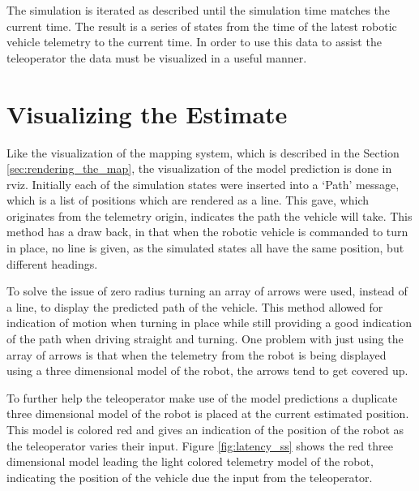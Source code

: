 \documentclass[12pt]{report}
\begin{document}
The simulation is iterated as described until the simulation time matches the current time.  The result is a series of states from the time of the latest robotic vehicle telemetry to the current time.  In order to use this data to assist the teleoperator the data must be visualized in a useful manner.

\section{Visualizing the Estimate}
Like the visualization of the mapping system, which is described in the Section \ref{sec:rendering_the_map}, the visualization of the model prediction is done in rviz.  Initially each of the simulation states were inserted into a `Path' message, which is a list of positions which are rendered as a line.  This gave, which originates from the telemetry origin, indicates the path the vehicle will take.  This method has a draw back, in that when the robotic vehicle is commanded to turn in place, no line is given, as the simulated states all have the same position, but different headings.

To solve the issue of zero radius turning an array of arrows were used, instead of a line, to display the predicted path of the vehicle.  This method allowed for indication of motion when turning in place while still providing a good indication of the path when driving straight and turning.  One problem with just using the array of arrows is that when the telemetry from the robot is being displayed using a three dimensional model of the robot, the arrows tend to get covered up.

To further help the teleoperator make use of the model predictions a duplicate three dimensional model of the robot is placed at the current estimated position.  This model is colored red and gives an indication of the position of the robot as the teleoperator varies their input.  Figure \ref{fig:latency_ss} shows the red three dimensional model leading the light colored telemetry model of the robot, indicating the position of the vehicle due the input from the teleoperator.
\end{document}

